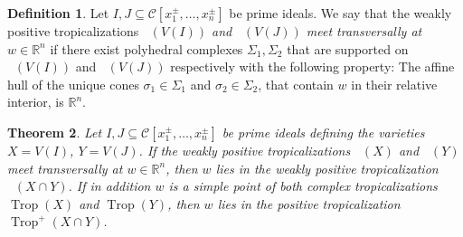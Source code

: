 \documentclass{article}
\newtheorem{theorem}{Theorem}[section]
\theoremstyle{definition}
\newtheorem{definition}[theorem]{Definition}
\DeclareMathOperator{\Trop}{Trop}
\DeclareMathOperator{\Tropw}{Trop_\mathcal{C}^+}
\newcommand{\R}{\mathbb{R}}
\begin{document}
\begin{definition}
        Let $I,J \subseteq \mathcal{C}[x_1^\pm, \dots, x_n^\pm]$ be prime ideals. We say that the weakly positive tropicalizations \emph{$\Tropw(V(I))$ and $ \Tropw(V(J))$ meet transversally at $w \in \R^n$} if there exist polyhedral complexes
     $\Sigma_1, \Sigma_2$ that are supported on $\Tropw(V(I))$ and $ \Tropw(V(J))$ respectively with the following property: The affine hull of the unique cones
     $\sigma_1 \in \Sigma_1$ and $\sigma_2 \in \Sigma_2$, that contain $w$ in their relative interior, is $\R^n$.
\end{definition}

\begin{theorem}
\label{thm: weakly positive transverse intersection}
    Let $I, J \subseteq \mathcal{C}[x_1^\pm, \dots, x_n^\pm]$ be prime ideals defining the varieties $X = V(I)$, $Y = V(J)$. If  the weakly positive tropicalizations $\Tropw(X)$ and $ \Tropw(Y)$  meet transversally at  $w \in \R^n$,
    then $w $ lies in the weakly positive tropicalization $ \Tropw(X \cap Y )$.
    If in addition $w$ is a simple point of both complex tropicalizations $\Trop(X)$ and $ \Trop(Y)$, then
    $w$ lies in the positive tropicalization $\Trop^+(X \cap Y)$.
\end{theorem}
\end{document}
